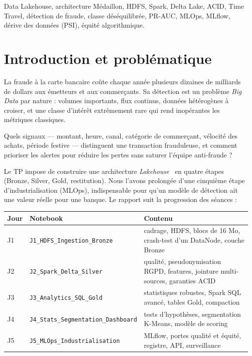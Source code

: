 \documentclass[11pt,a4paper]{article}
\newcommand{\code}[1]{\texttt{\small #1}}
\begin{document}
\vspace{4pt}
\begin{keybox}
Data Lakehouse, architecture Médaillon, HDFS, Spark, Delta Lake, ACID, Time Travel, détection de fraude, classe déséquilibrée,
PR-AUC, MLOps, MLflow, dérive des données (PSI), équité algorithmique.
\end{keybox}

\tableofcontents
\newpage

\section{Introduction et problématique}

La fraude à la carte bancaire coûte chaque année plusieurs dizaines de milliards de dollars aux émetteurs et aux commerçants.
Sa détection est un problème \emph{Big Data} par nature : volumes importants, flux continus, données hétérogènes à croiser,
et une classe d'intérêt extrêmement rare qui rend inopérantes les métriques classiques.

\begin{keybox}[Problématique]
Quels signaux — montant, heure, canal, catégorie de commerçant, vélocité des achats, période festive — distinguent une
transaction frauduleuse, et comment prioriser les alertes pour réduire les pertes sans saturer l'équipe anti-fraude ?
\end{keybox}

Le TP impose de construire une architecture \emph{Lakehouse}~\cite{armbrust2021} en quatre étapes (Bronze, Silver, Gold, restitution). Nous l'avons
prolongée d'une cinquième étape d'industrialisation (MLOps), indispensable pour qu'un modèle de détection ait une valeur réelle
pour une banque. Le rapport suit la progression des séances :

\begin{center}
\begin{tabularx}{\linewidth}{@{}l l Y@{}}
\toprule
\textbf{Jour} & \textbf{Notebook} & \textbf{Contenu} \\ \midrule
J1 & \code{J1\_HDFS\_Ingestion\_Bronze} & cadrage, HDFS, blocs de 16 Mo, crash-test d'un DataNode, couche Bronze \\
J2 & \code{J2\_Spark\_Delta\_Silver} & qualité, pseudonymisation RGPD, features, jointure multi-sources, garanties ACID \\
J3 & \code{J3\_Analytics\_SQL\_Gold} & statistiques robustes, Spark SQL avancé, tables Gold, compaction \\
J4 & \code{J4\_Stats\_Segmentation\_Dashboard} & tests d'hypothèses, segmentation K-Means, modèle de scoring \\
J5 & \code{J5\_MLOps\_Industrialisation} & MLflow, portes qualité et équité, registre, API, surveillance \\
\bottomrule
\end{tabularx}
\end{center}
\end{document}
